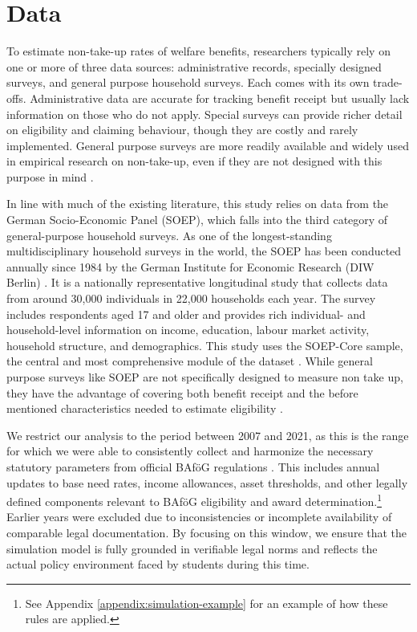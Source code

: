 %
%




\section{Data}
To estimate non-take-up rates of welfare benefits, researchers typically rely on one or more of three data sources: administrative records, specially designed surveys, and general purpose household surveys. 
Each comes with its own trade-offs. 
Administrative data are accurate for tracking benefit receipt but usually lack information on those who do not apply. 
Special surveys can provide richer detail on eligibility and claiming behaviour, though they are costly and rarely implemented. 
General purpose surveys are more readily available and widely used in empirical research on non-take-up, even if they are not designed with this purpose in mind \citep{mechelen_who_2017}.

In line with much of the existing literature, this study relies on data from the German Socio-Economic Panel (SOEP), which falls into the third category of general-purpose household surveys. 
As one of the longest-standing multidisciplinary household surveys in the world, the SOEP has been conducted annually since 1984 by the German Institute for Economic Research (DIW Berlin) \citep{soepcore_v39}. 
It is a nationally representative longitudinal study that collects data from around 30,000 individuals in 22,000 households each year. 
The survey includes respondents aged 17 and older and provides rich individual- and household-level information on income, education, labour market activity, household structure, and demographics. 
This study uses the SOEP-Core sample, the central and most comprehensive module of the dataset \citep{berlin_diw_nodate}. While general purpose surveys like SOEP are not specifically designed to measure non take up, they have the advantage of covering both benefit receipt and the before mentioned characteristics needed to estimate eligibility \citep{mechelen_who_2017}.

We restrict our analysis to the period between 2007 and 2021, as this is the range for which we were able to consistently collect and harmonize the necessary statutory parameters from official BAföG regulations \citep{bafoeg_law}. This includes annual updates to base need rates, income allowances, asset thresholds, and other legally defined components relevant to BAföG eligibility and award determination.\footnote{
  See Appendix \ref{appendix:simulation-example} for an example of how these rules are applied.
}
Earlier years were excluded due to inconsistencies or incomplete availability of comparable legal documentation. 
By focusing on this window, we ensure that the simulation model is fully grounded in verifiable legal norms and reflects the actual policy environment faced by students during this time.

